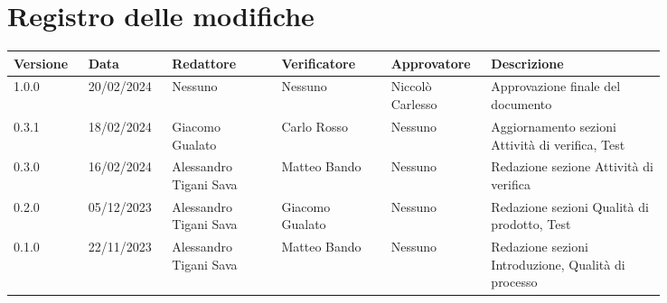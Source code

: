 \section*{Registro delle modifiche}
{
\renewcommand{\arraystretch}{1.5}
\scriptsize
\begin{longtable}{p{0.10\linewidth}p{0.10\linewidth}p{0.15\linewidth}p{0.15\linewidth}p{0.10\linewidth}p{0.24\linewidth}}
	\textbf{Versione} & \textbf{Data} & \textbf{Redattore}	& \textbf{Verificatore} & \textbf{Approvatore} & \textbf{Descrizione}	\\
	\toprule
	1.0.0	& 20/02/2024	& Nessuno					& Nessuno			& Niccolò Carlesso	& Approvazione finale del documento	\\
	\hline
	0.3.1	& 18/02/2024	& Giacomo Gualato			& Carlo Rosso		& Nessuno	& Aggiornamento sezioni Attività di verifica, Test	\\
	\hline
	0.3.0	& 16/02/2024	& Alessandro Tigani Sava	& Matteo Bando		& Nessuno	& Redazione sezione Attività di verifica	\\
	\hline
	0.2.0 	& 05/12/2023	& Alessandro Tigani Sava 	& Giacomo Gualato	& Nessuno	& Redazione sezioni Qualità di prodotto, Test \\
	\hline
	0.1.0	& 22/11/2023    & Alessandro Tigani Sava	& Matteo Bando		& Nessuno	& Redazione sezioni Introduzione, Qualità di processo	\\
	\bottomrule
\end{longtable}
}
